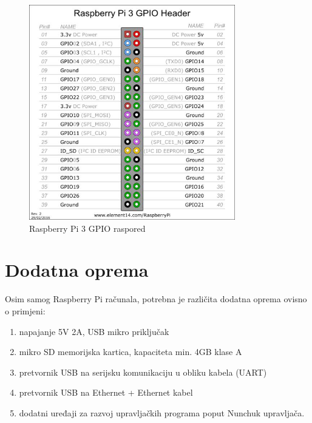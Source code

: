 \documentclass[11pt]{article}
\begin{document}
\begin{figure}[h!]
\centering
\includegraphics[width=0.8\textwidth]{rpi-3-pins.jpg}
\captionsetup{justification=centering}
\caption{Raspberry Pi 3 GPIO raspored}
\end{figure}

\clearpage
\section{Dodatna oprema}
Osim samog Raspberry Pi računala, potrebna je različita dodatna oprema ovisno
 o primjeni:

\begin{enumerate}
	\item napajanje 5V 2A, USB mikro priključak
	\item mikro SD memorijska kartica, kapaciteta min. 4GB klase A
	\item pretvornik USB na serijsku komunikaciju u obliku kabela (UART)
	\item pretvornik USB na Ethernet + Ethernet kabel
	\item dodatni uređaji za razvoj upravljačkih programa poput Nunchuk
		 upravljača.
\end{enumerate}
\end{document}
